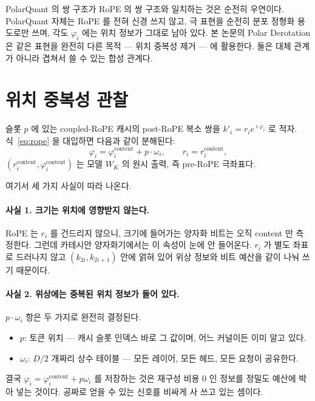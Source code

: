 \documentclass[10pt,twocolumn]{article}
\begin{document}
PolarQuant 의 쌍 구조가 RoPE 의 쌍 구조와 일치하는 것은 순전히 우연이다. PolarQuant 자체는 RoPE 를 전혀 신경 쓰지 않고, 극 표현을 순전히 분포 정형화 용도로만 쓰며, 각도 $\varphi_i$ 에는 위치 정보가 그대로 남아 있다. 본 논문의 Polar Derotation 은 같은 표현을 완전히 다른 목적 --- 위치 중복성 제거 --- 에 활용한다. 둘은 대체 관계가 아니라 겹쳐서 쓸 수 있는 합성 관계다.

\section{위치 중복성 관찰}
\label{sec:observation}

슬롯 $p$ 에 있는 coupled-RoPE 캐시의 post-RoPE 복소 쌍을 $k'_i=r_ie^{\imath\varphi_i}$ 로 적자. 식~\eqref{eq:rope} 을 대입하면 다음과 같이 분해된다:
\begin{equation}
  \varphi_i=\varphi^{\text{content}}_i+p\cdot\omega_i,\qquad
  r_i=r^{\text{content}}_i,
  \label{eq:decompose}
\end{equation}
$(r^{\text{content}}_i,\varphi^{\text{content}}_i)$ 는 모델 $W_K$ 의 원시 출력, 즉 pre-RoPE 극좌표다.

여기서 세 가지 사실이 따라 나온다.

\paragraph{사실 1. 크기는 위치에 영향받지 않는다.}
RoPE 는 $r_i$ 를 건드리지 않으니, 크기에 들어가는 양자화 비트는 오직 content 만 측정한다. 그런데 카테시안 양자화기에서는 이 속성이 눈에 안 들어온다. $r_i$ 가 별도 좌표로 드러나지 않고 $(k_{2i},k_{2i+1})$ 안에 얽혀 있어 위상 정보와 비트 예산을 같이 나눠 쓰기 때문이다.

\paragraph{사실 2. 위상에는 중복된 위치 정보가 들어 있다.}
$p\cdot\omega_i$ 항은 두 가지로 완전히 결정된다.
\begin{itemize}[leftmargin=*,topsep=1pt,itemsep=0pt]
\item $p$: 토큰 위치 --- 캐시 슬롯 인덱스 바로 그 값이며, 어느 커널이든 이미 알고 있다.
\item $\omega_i$: $D/2$ 개짜리 상수 테이블 --- 모든 레이어, 모든 헤드, 모든 요청이 공유한다.
\end{itemize}
결국 $\varphi_i=\varphi^{\text{content}}_i+p\omega_i$ 를 저장하는 것은 재구성 비용 $0$ 인 정보를 정밀도 예산에 박아 넣는 것이다. 공짜로 얻을 수 있는 신호를 비싸게 사 쓰고 있는 셈이다.
\end{document}
